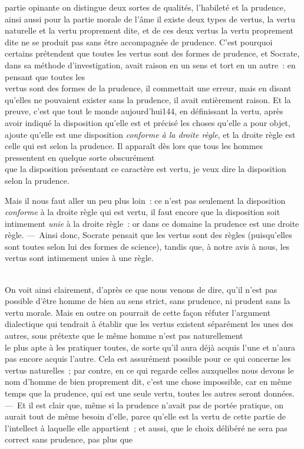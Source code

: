 \documentclass[french,twoside]{book} %
\begin{document}
partie opinante on distingue deux sortes de qualités, l’habileté et la prudence, ainsi aussi pour la partie morale de l’âme il existe deux types de vertus, la vertu naturelle et la vertu proprement dite, et de ces deux vertus la vertu proprement dite ne se produit pas sans être accompagnée de prudence. C’est pourquoi certains prétendent que toutes les vertus sont des formes de prudence, et Socrate, dans sa méthode d’investigation, avait raison en un sens et tort en un autre : en pensant que toutes les \\
vertus sont des formes de la prudence, il commettait une erreur, mais en disant qu’elles ne pouvaient exister sans la prudence, il avait entièrement raison. Et la preuve, c’est que tout le monde aujourd’hui144, en définissant la vertu, après avoir indiqué la disposition qu’elle est et précisé les choses qu’elle a pour objet, ajoute qu’elle est une disposition {\itshape conforme à la droite règle}, et la droite règle est celle qui est selon la prudence. Il apparaît dès lors que tous les hommes pressentent en quelque sorte obscurément \\
que la disposition présentant ce caractère est vertu, je veux dire la disposition selon la prudence.\par
Mais il nous faut aller un peu plus loin : ce n’est pas seulement la disposition {\itshape conforme} à la droite règle qui est vertu, il faut encore que la disposition soit intimement {\itshape unie} à la droite règle : or dans ce domaine la prudence est une droite règle. — Ainsi donc, Socrate pensait que les vertus sont des règles (puisqu’elles sont toutes selon lui des formes de science), tandis que, à notre avis à nous, les vertus sont intimement unies à une règle.\par
\\
On voit ainsi clairement, d’après ce que nous venons de dire, qu’il n’est pas possible d’être homme de bien au sens strict, sans prudence, ni prudent sans la vertu morale. Mais en outre on pourrait de cette façon réfuter l’argument dialectique qui tendrait à établir que les vertus existent séparément les unes des autres, sous prétexte que le même homme n’est pas naturellement \\
le plus apte à les pratiquer toutes, de sorte qu’il aura déjà acquis l’une et n’aura pas encore acquis l’autre. Cela est assurément possible pour ce qui concerne les vertus naturelles ; par contre, en ce qui regarde celles auxquelles nous devons le  nom d’homme de bien proprement dit, c’est une chose impossible, car en même temps que la prudence, qui est une seule vertu, toutes les autres seront données. — Et il est clair que, même si la prudence n’avait pas de portée pratique, on aurait tout de même besoin d’elle, parce qu’elle est la vertu de cette partie de l’intellect à laquelle elle appartient ; et aussi, que le choix délibéré ne sera pas correct sans prudence, pas plus que \\
\end{document}
